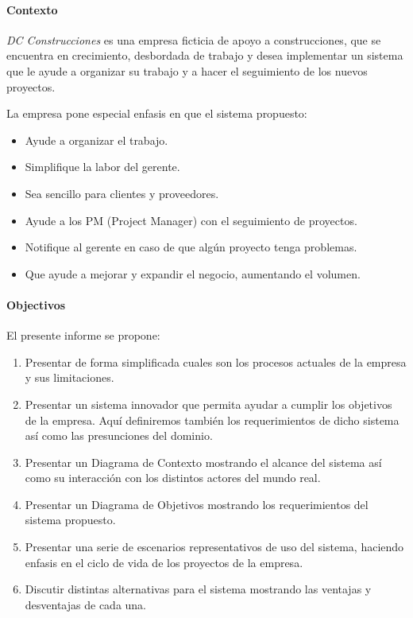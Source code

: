 \paragraph{Contexto}
\textit{DC Construcciones} es una empresa ficticia de apoyo a construcciones,
que se encuentra en crecimiento, desbordada de trabajo y desea implementar un
sistema que le ayude a organizar su trabajo y a hacer el seguimiento de los nuevos proyectos.

La empresa pone especial enfasis en que el sistema propuesto:

\begin{itemize}
    \item Ayude a organizar el trabajo.
    \item Simplifique la labor del gerente.
    \item Sea sencillo para clientes y proveedores.
    \item Ayude a los PM (Project Manager) con el seguimiento de proyectos.
    \item Notifique al gerente en caso de que algún proyecto tenga problemas.
    \item Que ayude a mejorar y expandir el negocio, aumentando el volumen.
\end{itemize}

\paragraph{Objectivos}
El presente informe se propone:

\begin{enumerate}
    \item Presentar de forma simplificada cuales son los procesos actuales de la empresa y sus limitaciones.
    \item Presentar un sistema innovador que permita ayudar a cumplir los objetivos de la empresa.
        Aquí definiremos también los requerimientos de dicho sistema así como las presunciones del dominio.
    \item Presentar un Diagrama de Contexto mostrando el alcance del sistema así como su interacción con los distintos actores del mundo real.
    \item Presentar un Diagrama de Objetivos mostrando los requerimientos del sistema propuesto.
    \item Presentar una serie de escenarios representativos de uso del sistema, haciendo enfasis en el ciclo de vida de los proyectos de la empresa.
    \item Discutir distintas alternativas para el sistema mostrando las ventajas y desventajas de cada una.
\end{enumerate}
